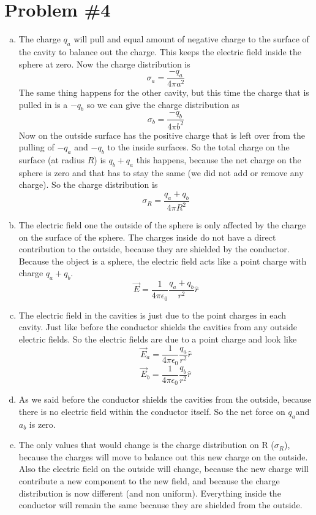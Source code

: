 \documentclass[11pt]{article}
\numberwithin{equation}{section}
\newcommand{\vecE}{\vec{E}}
\begin{document}
\section{Problem \#4}
\begin{enumerate}[(a)]
\item
The charge $q_a$ will pull and equal amount of negative charge to the surface of the cavity to balance out the charge. This keeps the electric field inside the sphere at zero. Now the charge distribution is
$$\sigma_a = \frac{-q_a}{4\pi a^2}$$
The same thing happens for the other cavity, but this time the charge that is pulled in is a $-q_b$ so we can give the charge distribution as
$$\sigma_b = \frac{-q_b}{4\pi b^2}$$
Now on the outside surface has the positive charge that is left over from the pulling of $-q_a$ and $-q_b$ to the inside surfaces. So the total charge on the surface (at radius $R$) is $q_b + q_a$ this happens, because the net charge on the sphere is zero and that has to stay the same (we did not add or remove any charge). So the charge distribution is
$$\sigma_R = \frac{q_a+q_b}{4\pi R^2}$$

\item
The electric field one the outside of the sphere is only affected by the charge on the surface of the sphere. The charges inside do not have a direct contribution to the outside, because they are shielded by the conductor. Because the object is a sphere, the electric field acts like a point charge with charge $q_a+q_b$.
$$\vecE = \frac{1}{4\pi \epsilon_0}\frac{q_a+q_b}{r^2}\hat{r}$$

\item
The electric field in the cavities is just due to the point charges in each cavity. Just like before the conductor shields the cavities from any outside electric fields. So the electric fields are due to a point charge and look like
$$\vecE_a = \frac{1}{4\pi \epsilon_0}\frac{q_a}{r^2}\hat{r}$$
$$\vecE_b = \frac{1}{4\pi \epsilon_0}\frac{q_b}{r^2}\hat{r}$$

\item
As we said before the conductor shields the cavities from the outside, because there is no electric field within the conductor itself. So the net force on $q_a$and $a_b$ is zero.

\item
The only values that would change is the charge distribution on R ($\sigma_R$), because the charges will move to balance out this new charge on the outside. Also the electric field on the outside will change, because the new charge will contribute a new component to the new field, and because the charge distribution is now different (and non uniform). Everything inside the conductor will remain the same because they are shielded from the outside.


\end{enumerate}
\end{document}
